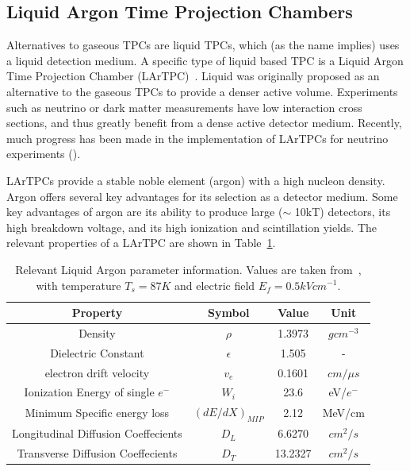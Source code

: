 \subsection{Liquid Argon Time Projection Chambers}
\label{sec:lartpcs}
Alternatives to gaseous TPCs are liquid TPCs, which (as the name implies) uses a liquid detection medium.
A specific type of liquid based TPC is a Liquid Argon Time Projection Chamber (LArTPC)~\citep{rubbia1977liquid}.
Liquid was originally proposed as an alternative to the gaseous TPCs to provide a denser active volume.
Experiments such as neutrino or dark matter measurements have low interaction cross sections, and thus greatly benefit from a dense active detector medium.
Recently, much progress has been made in the implementation of LArTPCs for neutrino experiments (\citep{ArgoNeuT_PhysRevD.99.012002, MicroBooNE_Acciarri_2017, LArIAT_Acciarri_2020}).

LArTPCs provide a stable noble element (argon) with a high nucleon density.
Argon offers several key advantages for its selection as a detector medium.
Some key advantages of argon are its ability to produce large ($\sim$ 10kT) detectors, its high breakdown voltage, and its high ionization and scintillation yields.
The relevant properties of a LArTPC are shown in Table~\ref{tab:lar_prop}.

\begin{table}
  \begin{center}
    \begin{tabular}{||c c c c||}
 \hline
      Property & Symbol & Value & Unit \\
 \hline\hline
      Density & $\rho$ &  1.3973 & $g cm^{-3}$ \\
      Dielectric Constant & $\epsilon$ & 1.505 & - \\
      electron drift velocity & $v_{e}$ & 0.1601 & $\unit{cm/\mu s}$ \\
      Ionization Energy of single $e^{-}$ & $W_{i}$ & 23.6 & eV/$e^{-}$ \\
      Minimum Specific energy loss & $(dE/dX)_{MIP}$ & 2.12 & MeV/cm \\
      Longitudinal Diffusion Coeffecients & $D_{L}$ & 6.6270 & $cm^{2}/s$ \\
      Transverse Diffusion Coeffecients & $D_{T}$ & 13.2327 & $cm^{2}/s$ \\
 \hline
    \end{tabular}
    \caption{
      Relevant Liquid Argon parameter information.
      Values are taken from~\citep{lardata_lbnl}, with temperature $T_{s} = 87 K$ and electric field $E_{f} = 0.5 kV cm^{-1}$.}
  \label{tab:lar_prop}
  \end{center}
\end{table}

